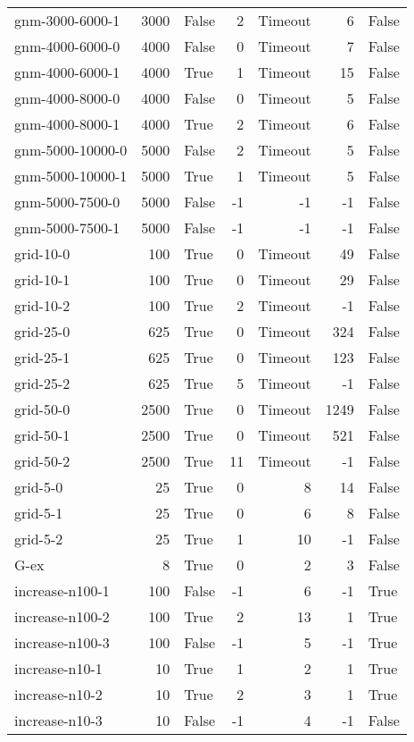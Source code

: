 \begin{longtable}{lrlrrrl}
gnm-3000-6000-1 & 3000 & False & 2 & Timeout & 6 & False \\
gnm-4000-6000-0 & 4000 & False & 0 & Timeout & 7 & False \\
gnm-4000-6000-1 & 4000 & True & 1 & Timeout & 15 & False \\
gnm-4000-8000-0 & 4000 & False & 0 & Timeout & 5 & False \\
gnm-4000-8000-1 & 4000 & True & 2 & Timeout & 6 & False \\
gnm-5000-10000-0 & 5000 & False & 2 & Timeout & 5 & False \\
gnm-5000-10000-1 & 5000 & True & 1 & Timeout & 5 & False \\
gnm-5000-7500-0 & 5000 & False & -1 & -1 & -1 & False \\
gnm-5000-7500-1 & 5000 & False & -1 & -1 & -1 & False \\
grid-10-0 & 100 & True & 0 & Timeout & 49 & False \\
grid-10-1 & 100 & True & 0 & Timeout & 29 & False \\
grid-10-2 & 100 & True & 2 & Timeout & -1 & False \\
grid-25-0 & 625 & True & 0 & Timeout & 324 & False \\
grid-25-1 & 625 & True & 0 & Timeout & 123 & False \\
grid-25-2 & 625 & True & 5 & Timeout & -1 & False \\
grid-50-0 & 2500 & True & 0 & Timeout & 1249 & False \\
grid-50-1 & 2500 & True & 0 & Timeout & 521 & False \\
grid-50-2 & 2500 & True & 11 & Timeout & -1 & False \\
grid-5-0 & 25 & True & 0 & 8 & 14 & False \\
grid-5-1 & 25 & True & 0 & 6 & 8 & False \\
grid-5-2 & 25 & True & 1 & 10 & -1 & False \\
G-ex & 8 & True & 0 & 2 & 3 & False \\
increase-n100-1 & 100 & False & -1 & 6 & -1 & True \\
increase-n100-2 & 100 & True & 2 & 13 & 1 & True \\
increase-n100-3 & 100 & False & -1 & 5 & -1 & True \\
increase-n10-1 & 10 & True & 1 & 2 & 1 & True \\
increase-n10-2 & 10 & True & 2 & 3 & 1 & True \\
increase-n10-3 & 10 & False & -1 & 4 & -1 & False \\

\end{longtable}
